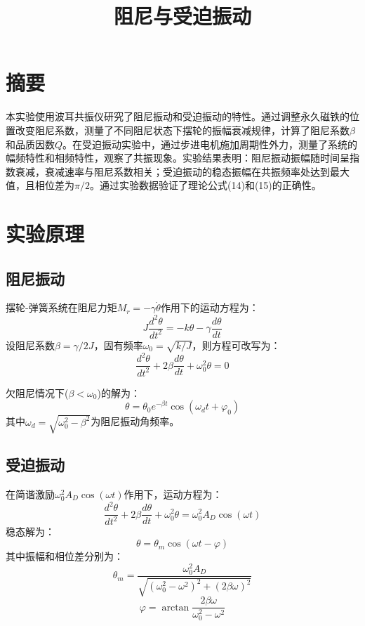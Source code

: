 \documentclass[UTF8]{ctexart}
\title{阻尼与受迫振动}
\author{}
\date{}
\begin{document}
\maketitle

\section{摘要}
本实验使用波耳共振仪研究了阻尼振动和受迫振动的特性。通过调整永久磁铁的位置改变阻尼系数，测量了不同阻尼状态下摆轮的振幅衰减规律，计算了阻尼系数$\beta$和品质因数$Q$。在受迫振动实验中，通过步进电机施加周期性外力，测量了系统的幅频特性和相频特性，观察了共振现象。实验结果表明：阻尼振动振幅随时间呈指数衰减，衰减速率与阻尼系数相关；受迫振动的稳态振幅在共振频率处达到最大值，且相位差为$\pi/2$。通过实验数据验证了理论公式(14)和(15)的正确性。

\section{实验原理}
\subsection{阻尼振动}
摆轮-弹簧系统在阻尼力矩$M_r = -\gamma \dot{\theta}$作用下的运动方程为：
\begin{equation}
J \frac{d^2 \theta}{dt^2} = -k \theta - \gamma \frac{d \theta}{dt}
\end{equation}
设阻尼系数$\beta = \gamma/2J$，固有频率$\omega_0 = \sqrt{k/J}$，则方程可改写为：
\begin{equation}
\frac{d^2 \theta}{dt^2} + 2\beta \frac{d \theta}{dt} + \omega_0^2 \theta = 0
\end{equation}

欠阻尼情况下($\beta < \omega_0$)的解为：
\begin{equation}
\theta = \theta_0 e^{-\beta t} \cos(\omega_d t + \varphi_0)
\end{equation}
其中$\omega_d = \sqrt{\omega_0^2 - \beta^2}$为阻尼振动角频率。

\subsection{受迫振动}
在简谐激励$\omega_0^2 A_D \cos(\omega t)$作用下，运动方程为：
\begin{equation}
\frac{d^2 \theta}{dt^2} + 2\beta \frac{d\theta}{dt} + \omega_0^2 \theta = \omega_0^2 A_D \cos(\omega t)
\end{equation}
稳态解为：
\begin{equation}
\theta = \theta_m \cos(\omega t - \varphi)
\end{equation}
其中振幅和相位差分别为：
\begin{equation}
\theta_m = \frac{\omega_0^2 A_D}{\sqrt{(\omega_0^2 - \omega^2)^2 + (2\beta \omega)^2}}
\end{equation}
\begin{equation}
\varphi = \arctan \frac{2\beta \omega}{\omega_0^2 - \omega^2}
\end{equation}
\end{document}
